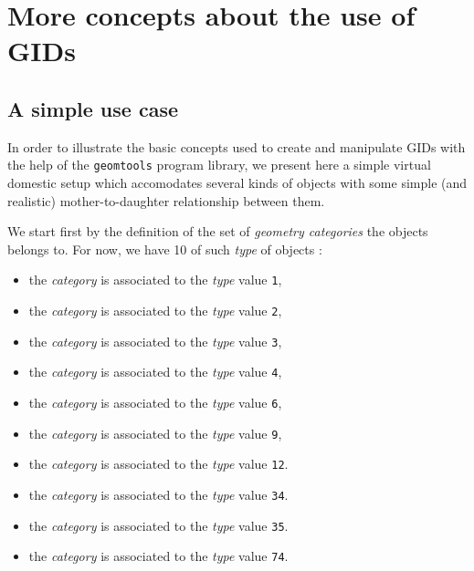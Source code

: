 
\section{More concepts about the use of GIDs}

\subsection{A simple use case}

\pn  In order  to illustrate  the basic  concepts used  to  create and
manipulate  GIDs  with  the  help of  the  \texttt{geomtools}  program
library,  we  present  here  a  simple virtual  domestic  setup  which
accomodates several kinds of  objects with some simple (and realistic)
mother-to-daughter relationship between them.

\pn  We start first  by the  definition of  the set  of \emph{geometry
  categories}  the objects belongs  to.  For  now, we  have 10  of such
\emph{type} of objects :
\begin{itemize}
  
\item the \emph{category}  is associated to the \emph{type}
  value \texttt{1},
  
\item the \emph{category}  is associated to the \emph{type}
  value \texttt{2},
  
\item the \emph{category}  is associated to the \emph{type}
  value \texttt{3},
 
\item the \emph{category}  is associated to the \emph{type}
  value \texttt{4},
  
\item the \emph{category}  is associated to the \emph{type}
  value \texttt{6},
   
\item the \emph{category}  is associated to the \emph{type}
  value \texttt{9},
  
\item the \emph{category}  is associated to the \emph{type}
  value \texttt{12}.
  
\item the \emph{category}  is associated to the \emph{type}
  value \texttt{34}.
  
\item the \emph{category}  is associated to the \emph{type}
  value \texttt{35}.
  
\item the \emph{category}  is associated to the \emph{type}
  value \texttt{74}.
  
\end{itemize}


